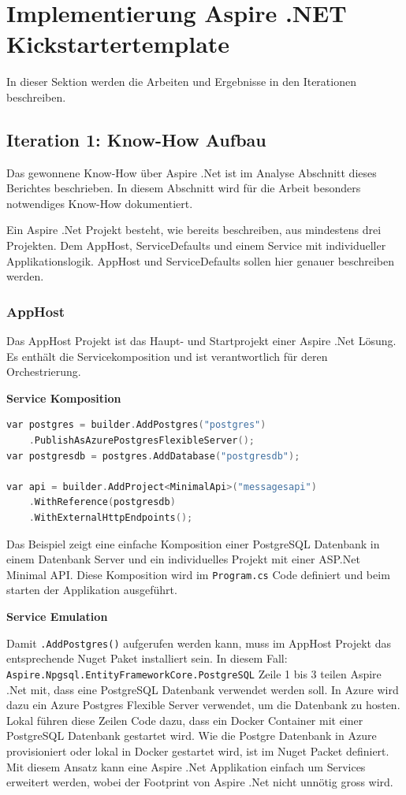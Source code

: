 \section{Implementierung Aspire .NET Kickstartertemplate}
    In dieser Sektion werden die Arbeiten und Ergebnisse in den Iterationen beschreiben.

    \subsection{Iteration 1: Know-How Aufbau}
        Das gewonnene Know-How über Aspire .Net ist im Analyse Abschnitt dieses Berichtes beschrieben. In diesem Abschnitt wird für die Arbeit besonders notwendiges Know-How dokumentiert.

        Ein Aspire .Net Projekt besteht, wie bereits beschreiben, aus mindestens drei Projekten. Dem AppHost, ServiceDefaults und einem Service mit individueller Applikationslogik. AppHost und ServiceDefaults sollen hier genauer beschreiben werden.

        \subsubsection{AppHost}
            
            Das AppHost Projekt ist das Haupt- und Startprojekt einer Aspire .Net Lösung. Es enthält die Servicekomposition und ist verantwortlich für deren Orchestrierung.

            \textbf{Service Komposition}
            
            \begin{lstlisting}[language=C, caption=Beipsiel einer PostgreSQL und .Net Api komposition]            
var postgres = builder.AddPostgres("postgres")
    .PublishAsAzurePostgresFlexibleServer();
var postgresdb = postgres.AddDatabase("postgresdb");

var api = builder.AddProject<MinimalApi>("messagesapi")
    .WithReference(postgresdb)
    .WithExternalHttpEndpoints();
            \end{lstlisting}
            Das Beispiel zeigt eine einfache Komposition einer PostgreSQL Datenbank in einem Datenbank Server und ein individuelles Projekt mit einer ASP.Net Minimal API. Diese Komposition wird im \verb|Program.cs| Code definiert und beim starten der Applikation ausgeführt.

            \textbf{Service Emulation}
            
            Damit \verb|.AddPostgres()| aufgerufen werden kann, muss im AppHost Projekt das entsprechende Nuget Paket installiert sein. In diesem Fall: 
            \verb|Aspire.Npgsql.EntityFrameworkCore.PostgreSQL|
            Zeile 1 bis 3 teilen Aspire .Net mit, dass eine PostgreSQL Datenbank verwendet werden soll. In Azure wird dazu ein Azure Postgres Flexible Server verwendet, um die Datenbank zu hosten. Lokal führen diese Zeilen Code dazu, dass ein Docker Container mit einer PostgreSQL Datenbank gestartet wird. Wie die Postgre Datenbank in Azure provisioniert oder lokal in Docker gestartet wird, ist im Nuget Packet definiert. Mit diesem Ansatz kann eine Aspire .Net Applikation einfach um Services erweitert werden, wobei der Footprint von Aspire .Net nicht unnötig gross wird.

